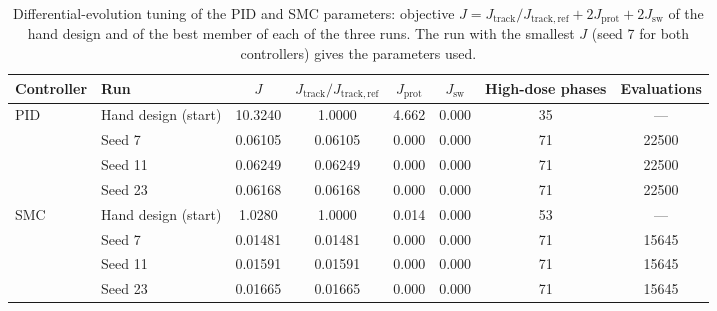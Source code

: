 \begin{table}[htbp]
\centering
\caption{Differential-evolution tuning of the PID and SMC parameters: objective $J=J_{\mathrm{track}}/J_{\mathrm{track,ref}}+2J_{\mathrm{prot}}+2J_{\mathrm{sw}}$ of the hand design and of the best member of each of the three runs. The run with the smallest $J$ (seed 7 for both controllers) gives the parameters used.}
\label{tab:tuning_runs}
\small
\begin{tabular}{llcccccc}
\toprule
Controller & Run & $J$ & $J_{\mathrm{track}}/J_{\mathrm{track,ref}}$ & $J_{\mathrm{prot}}$ & $J_{\mathrm{sw}}$ & High-dose phases & Evaluations \\
\midrule
PID & Hand design (start) & 10.3240 & 1.0000 & 4.662 & 0.000 & 35 & --- \\
 & Seed 7 & 0.06105 & 0.06105 & 0.000 & 0.000 & 71 & 22500 \\
 & Seed 11 & 0.06249 & 0.06249 & 0.000 & 0.000 & 71 & 22500 \\
 & Seed 23 & 0.06168 & 0.06168 & 0.000 & 0.000 & 71 & 22500 \\
\addlinespace
SMC & Hand design (start) & 1.0280 & 1.0000 & 0.014 & 0.000 & 53 & --- \\
 & Seed 7 & 0.01481 & 0.01481 & 0.000 & 0.000 & 71 & 15645 \\
 & Seed 11 & 0.01591 & 0.01591 & 0.000 & 0.000 & 71 & 15645 \\
 & Seed 23 & 0.01665 & 0.01665 & 0.000 & 0.000 & 71 & 15645 \\
\bottomrule
\end{tabular}
\end{table}
